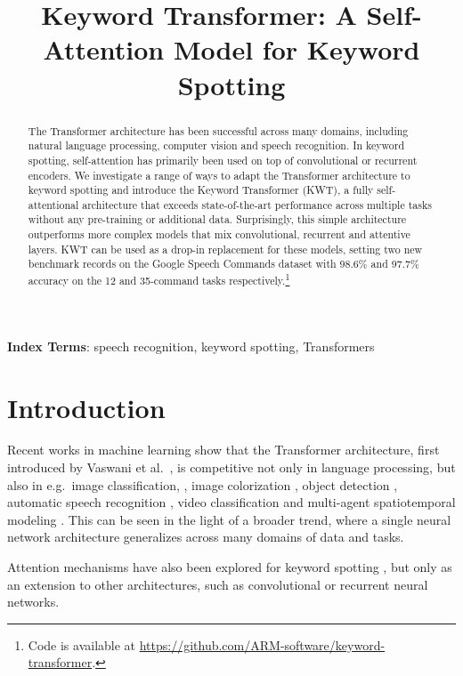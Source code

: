 \documentclass[a4paper]{article}
\title{Keyword Transformer: A Self-Attention Model for Keyword Spotting}
\begin{document}
\maketitle
\begin{abstract}
The Transformer architecture has been successful across many domains, including natural language processing, computer vision and speech recognition. In keyword spotting, self-attention has primarily been used on top of convolutional or recurrent encoders. We investigate a range of ways to adapt the Transformer architecture to keyword spotting and introduce the Keyword Transformer (KWT), a fully self-attentional architecture that exceeds state-of-the-art performance across multiple tasks without any pre-training or additional data. Surprisingly, this simple architecture outperforms more complex models that mix convolutional, recurrent and attentive layers. KWT can be used as a drop-in replacement for these models, setting two new benchmark records on the Google Speech Commands dataset with 98.6\% and 97.7\% accuracy on the 12 and 35-command tasks respectively.\footnote{Code is available at \href{https://github.com/ARM-software/keyword-transformer}{https://github.com/ARM-software/keyword-transformer}.}
\end{abstract}
\noindent\textbf{Index Terms}: speech recognition, keyword spotting, Transformers

\section{Introduction}

Recent works in machine learning show that the Transformer architecture, first introduced by Vaswani et al.\ \cite{vaswani2017attention}, is competitive not only in language processing, but also in e.g.\ image classification, \cite{dosovitskiy2020image, touvron2020training, yuan2021tokens}, image colorization \cite{kumar2021colorization}, object detection \cite{carion2020end}, automatic speech recognition \cite{gulati2020conformer, chenwu2020streaming, liu2020tera}, video classification \cite{neimark2021video} and multi-agent spatiotemporal modeling \cite{alcorn2021baller2vec}. This can be seen in the light of a broader trend, where a single neural network architecture generalizes across many domains of data and tasks.

Attention mechanisms have also been explored for keyword spotting \cite{de2018neural, rybakov2020streaming}, but only as an extension to other architectures, such as convolutional or recurrent neural networks.
\end{document}
